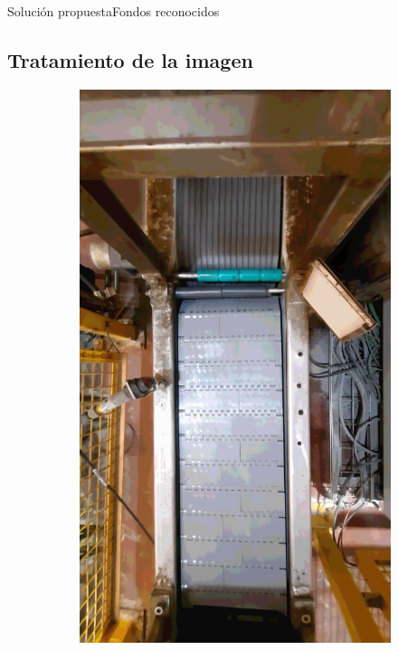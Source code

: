 \documentclass{beamer}
\begin{document}
\begin{frame}{Solución propuesta}{Fondos reconocidos}
\subsection{Tratamiento de la imagen}
\begin{figure}
\centering
    \begin{subfigure}[t]{0.3\textwidth}
        \includegraphics[width=\textwidth]{img/F1.png}
    \end{subfigure}

\end{figure}
\end{frame}
\end{document}
